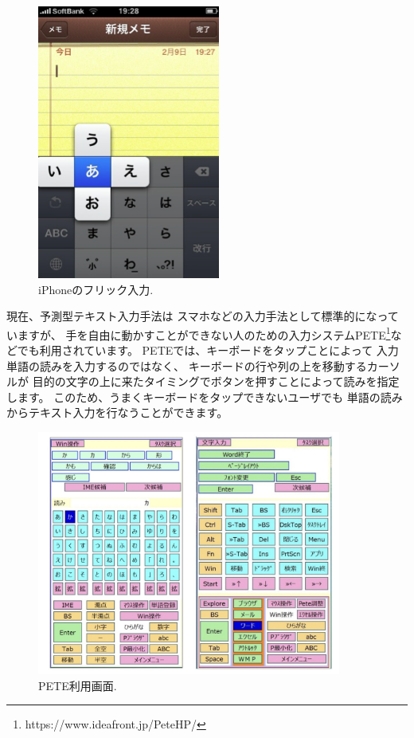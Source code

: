 \documentclass[topics]{compsoft} %
\begin{document}
\begin{figure}[h]
  \centerline{\includegraphics[width=6cm,bb=0 0 294 442]{figures/1691febad27439d3bf44232c54dcb1e8.png}}
  \caption{iPhoneのフリック入力.}
  \label{flick}
\end{figure}

現在、予測型テキスト入力手法は
スマホなどの入力手法として標準的になっていますが、
手を自由に動かすことができない人のための入力システムPETE\footnote{
  \textsf{https:{\slash}{\slash}www.ideafront.jp{\slash}PeteHP{\slash}}
}などでも利用されています。
PETEでは、キーボードをタップことによって
入力単語の読みを入力するのではなく、
キーボードの行や列の上を移動するカーソルが
目的の文字の上に来たタイミングでボタンを押すことによって読みを指定します。
このため、うまくキーボードをタップできないユーザでも
単語の読みからテキスト入力を行なうことができます。

\begin{figure}[h]
  \includegraphics[width=10cm,bb=0 0 1456 1172]{figures/a2f652e2f488b96974e92f8198f49469.jpg}
  \caption{PETE利用画面.}
  \label{pete}
\end{figure}
\end{document}
